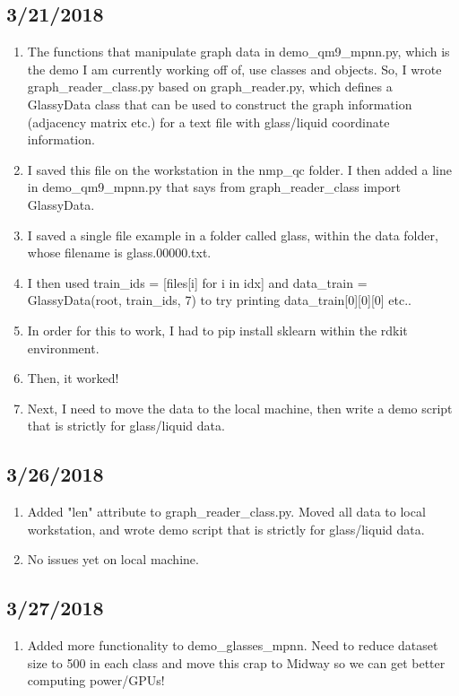 \documentclass[12pt,reqno]{amsart}
\numberwithin{equation}{section}
\begin{document}
\subsection{3/21/2018}

\begin{enumerate}
\item The functions that manipulate graph data in demo\_qm9\_mpnn.py, which is the demo I am currently working off of, use classes and objects.  So, I wrote graph\_reader\_class.py based on graph\_reader.py, which defines a GlassyData class that can be used to construct the graph information (adjacency matrix etc.) for a text file with glass/liquid coordinate information.  
\item I saved this file on the workstation in the nmp\_qc folder.  I then added a line in demo\_qm9\_mpnn.py that says from graph\_reader\_class import GlassyData.  
\item I saved a single file example in a folder called glass, within the data folder, whose filename is glass.00000.txt.  
\item I then used train\_ids = [files[i] for i in idx] and data\_train = GlassyData(root, train\_ids, 7) to try printing data\_train[0][0][0] etc..
\item In order for this to work, I had to pip install sklearn within the rdkit environment.
\item Then, it worked! 
\item Next, I need to move the data to the local machine, then write a demo script that is strictly for glass/liquid data.  
\end{enumerate}

\subsection{3/26/2018}

\begin{enumerate}
\item Added "len" attribute to graph\_reader\_class.py.  Moved all data to local workstation, and wrote demo script that is strictly for glass/liquid data.
\item No issues yet on local machine.  
\end{enumerate}

\subsection{3/27/2018}

\begin{enumerate}
\item Added more functionality to demo\_glasses\_mpnn.  Need to reduce dataset size to 500 in each class and move this crap to Midway so we can get better computing power/GPUs!  
\end{enumerate}
\end{document}
